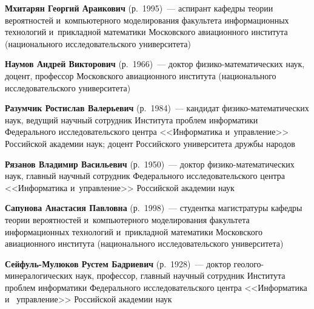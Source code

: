 \begin{multicols}{2}
\vspace*{3pt}


\noindent
\textbf{Мхитарян Георгий  Араикович} (р.\ 1995)~--- 
аспирант кафедры теории вероятностей и~компьютерного моделирования 
факультета информационных технологий и~прикладной математики 
Московского авиационного института (национального исследовательского университета) 

\vspace*{3pt}




\noindent
\textbf{Наумов Андрей Викторович} (р.\ 1966)~--- доктор фи\-зи\-ко-ма\-те\-ма\-ти\-че\-ских 
наук, доцент, профессор Мос\-ков\-ско\-го авиационного института 
(национального исследовательского университета)

\vspace*{3pt}


\noindent
\textbf{Разумчик Ростислав Валерьевич} (р.\ 1984)~--- 
кандидат фи\-зи\-ко-ма\-те\-ма\-ти\-че\-ских наук, ведущий научный сотрудник 
Института проб\-лем информатики Федерального исследовательского центра 
<<Информатика и~управ\-ле\-ние>> Российской академии наук; доцент Российского 
университета дружбы народов

\vspace*{3pt}


\noindent
\textbf{Рязанов Владимир Васильевич} (р.\ 1950)~--- 
доктор фи\-зи\-ко-ма\-те\-ма\-ти\-че\-ских наук, 
главный научный сотрудник Федерального исследовательского центра 
<<Информатика и~управ\-ле\-ние>> Российской академии наук

\vspace*{3pt}


\noindent
\textbf{Сапунова Анастасия Павловна} (р.\ 1998)~--- студентка 
магистратуры кафедры теории вероятностей и~компьютерного моделирования 
факультета информационных технологий и~прикладной математики 
Московского авиационного института (национального исследовательского университета)


\vspace*{3pt}


\noindent
\textbf{Сейфуль-Мулюков Рустем Бадриевич} (р.\ 1928)~--- 
доктор гео\-ло\-го-ми\-не\-ра\-ло\-ги\-че\-ских наук, про\-фессор, 
главный научный сотрудник Института проб\-лем информатики 
Федерального исследовательского центра <<Информатика и~ управ\-ле\-ние>>
 Российской академии наук
 
\vspace*{3pt}



\end{multicols}
